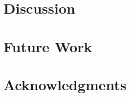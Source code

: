 \documentclass{acm_proc_article-sp}
\begin{document}
\section{Discussion}
\label{sec:discussion}


\section{Future Work}
\label{sec:future}


\section{Acknowledgments}
\label{sec:acknowledgements}




{}

\end{document}
